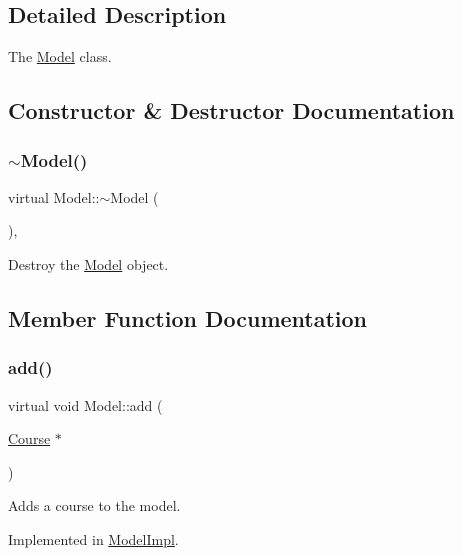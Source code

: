 \subsection{Detailed Description}
The \hyperlink{classModel}{Model} class. 

\subsection{Constructor \& Destructor Documentation}
\mbox{\label{classModel_af032d8433c87a0a3a431faf6563a1f03}} 
\subsubsection{\texorpdfstring{$\sim$\+Model()}{~Model()}}
{\footnotesize\ttfamily virtual Model\+::$\sim$\+Model (\begin{DoxyParamCaption}{ }\end{DoxyParamCaption})\hspace{0.3cm}{\ttfamily [inline]}, {\ttfamily [virtual]}}



Destroy the \hyperlink{classModel}{Model} object. 



\subsection{Member Function Documentation}
\mbox{\label{classModel_aff2385b433de34af14232ec8f7db126e}} 
\subsubsection{\texorpdfstring{add()}{add()}}
{\footnotesize\ttfamily virtual void Model\+::add (\begin{DoxyParamCaption}\item[{\hyperlink{classCourse}{Course} $\ast$}]{ }\end{DoxyParamCaption})\hspace{0.3cm}{\ttfamily [pure virtual]}}



Adds a course to the model. 



Implemented in \hyperlink{classModelImpl_a1847f819acc9bf909e31ec3438973225}{Model\+Impl}.

